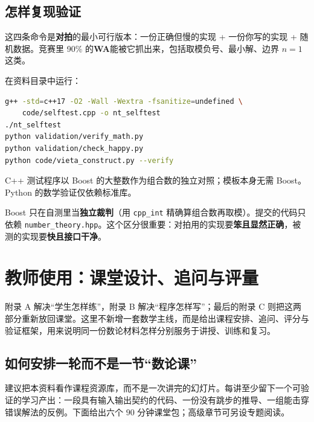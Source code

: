 \documentclass[UTF8,a4paper,11pt,twoside,openright,fontset=fandol]{ctexbook}
\theoremstyle{definition}
\begin{document}
\section{怎样复现验证}

\begin{tip}
这四条命令是\textbf{对拍}的最小可行版本：一份正确但慢的实现 + 一份你写的实现 + 随机数据。竞赛里 90\% 的\textbf{WA}能被它抓出来，包括取模负号、最小解、边界 $n=1$ 这类。
\end{tip}

在资料目录中运行：
\begin{lstlisting}[language=bash]
g++ -std=c++17 -O2 -Wall -Wextra -fsanitize=undefined \
    code/selftest.cpp -o nt_selftest
./nt_selftest
python validation/verify_math.py
python validation/check_happy.py
python code/vieta_construct.py --verify
\end{lstlisting}
C++ 测试程序以 Boost 的大整数作为组合数的独立对照；模板本身无需 Boost。Python 的数学验证仅依赖标准库。

\begin{tip}
Boost 只在自测里当\textbf{独立裁判}（用 \texttt{cpp\_int} 精确算组合数再取模）。提交的代码只依赖 \texttt{number\_theory.hpp}。这个区分很重要：对拍用的实现要\textbf{笨且显然正确}，被测的实现要\textbf{快且接口干净}。
\end{tip}


\clearpage
\setcounter{page}{1}
\chapter{教师使用：课堂设计、追问与评量}
\begin{chapterintro}[章节导读]
附录 A 解决“学生怎样练”，附录 B 解决“程序怎样写”；最后的附录 C 则把这两部分重新放回课堂。这里不新增一套数学主线，而是给出课程安排、追问、评分与验证框架，用来说明同一份数论材料怎样分别服务于讲授、训练和复习。
\end{chapterintro}

\section{如何安排一轮而不是一节“数论课”}
建议把本资料看作课程资源库，而不是一次讲完的幻灯片。每讲至少留下一个可验证的学习产出：一段具有输入输出契约的代码、一份没有跳步的推导、一组能击穿错误解法的反例。下面给出六个 $90$ 分钟课堂包；高级章节可另设专题阅读。
\end{document}
